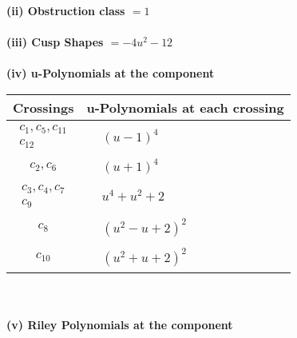 \documentclass[1p]{elsarticle_modified}
\theoremstyle{definition}
\begin{document}
\flushleft \textbf{(ii) Obstruction class $= 1$}\\~\\
\flushleft \textbf{(iii) Cusp Shapes $= -4 u^2-12$}\\~\\
\newpage\renewcommand{\arraystretch}{1}
\flushleft \textbf{(iv) u-Polynomials at the component}\newline \\
\begin{tabular}{m{50pt}|m{274pt}}
Crossings & \hspace{64pt}u-Polynomials at each crossing \\
\hline $$\begin{aligned}c_{1},c_{5},c_{11}\\c_{12}\end{aligned}$$&$\begin{aligned}
&(u-1)^4
\end{aligned}$\\
\hline $$\begin{aligned}c_{2},c_{6}\end{aligned}$$&$\begin{aligned}
&(u+1)^4
\end{aligned}$\\
\hline $$\begin{aligned}c_{3},c_{4},c_{7}\\c_{9}\end{aligned}$$&$\begin{aligned}
&u^4+u^2+2
\end{aligned}$\\
\hline $$\begin{aligned}c_{8}\end{aligned}$$&$\begin{aligned}
&(u^2- u+2)^2
\end{aligned}$\\
\hline $$\begin{aligned}c_{10}\end{aligned}$$&$\begin{aligned}
&(u^2+u+2)^2
\end{aligned}$\\
\hline
\end{tabular}\\~\\
\newpage\renewcommand{\arraystretch}{1}
\flushleft \textbf{(v) Riley Polynomials at the component}\newline \\
\end{document}
